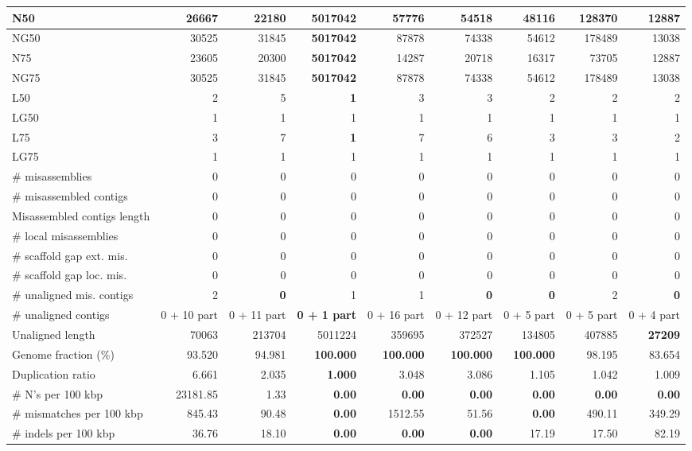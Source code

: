 \documentclass[12pt,a4paper]{article}
\begin{document}
\begin{table}[ht]
\begin{center}
\begin{tabular}{|l*{8}{|r}|}
N50 & 26667 & 22180 & {\bf 5017042} & 57776 & 54518 & 48116 & 128370 & 12887 \\ \hline
NG50 & 30525 & 31845 & {\bf 5017042} & 87878 & 74338 & 54612 & 178489 & 13038 \\ \hline
N75 & 23605 & 20300 & {\bf 5017042} & 14287 & 20718 & 16317 & 73705 & 12887 \\ \hline
NG75 & 30525 & 31845 & {\bf 5017042} & 87878 & 74338 & 54612 & 178489 & 13038 \\ \hline
L50 & 2 & 5 & {\bf 1} & 3 & 3 & 2 & 2 & 2 \\ \hline
LG50 & 1 & 1 & 1 & 1 & 1 & 1 & 1 & 1 \\ \hline
L75 & 3 & 7 & {\bf 1} & 7 & 6 & 3 & 3 & 2 \\ \hline
LG75 & 1 & 1 & 1 & 1 & 1 & 1 & 1 & 1 \\ \hline
\# misassemblies & 0 & 0 & 0 & 0 & 0 & 0 & 0 & 0 \\ \hline
\# misassembled contigs & 0 & 0 & 0 & 0 & 0 & 0 & 0 & 0 \\ \hline
Misassembled contigs length & 0 & 0 & 0 & 0 & 0 & 0 & 0 & 0 \\ \hline
\# local misassemblies & 0 & 0 & 0 & 0 & 0 & 0 & 0 & 0 \\ \hline
\# scaffold gap ext. mis. & 0 & 0 & 0 & 0 & 0 & 0 & 0 & 0 \\ \hline
\# scaffold gap loc. mis. & 0 & 0 & 0 & 0 & 0 & 0 & 0 & 0 \\ \hline
\# unaligned mis. contigs & 2 & {\bf 0} & 1 & 1 & {\bf 0} & {\bf 0} & 2 & {\bf 0} \\ \hline
\# unaligned contigs & 0 + 10 part & 0 + 11 part & {\bf 0 + 1 part} & 0 + 16 part & 0 + 12 part & 0 + 5 part & 0 + 5 part & 0 + 4 part \\ \hline
Unaligned length & 70063 & 213704 & 5011224 & 359695 & 372527 & 134805 & 407885 & {\bf 27209} \\ \hline
Genome fraction (\%) & 93.520 & 94.981 & {\bf 100.000} & {\bf 100.000} & {\bf 100.000} & {\bf 100.000} & 98.195 & 83.654 \\ \hline
Duplication ratio & 6.661 & 2.035 & {\bf 1.000} & 3.048 & 3.086 & 1.105 & 1.042 & 1.009 \\ \hline
\# N's per 100 kbp & 23181.85 & 1.33 & {\bf 0.00} & {\bf 0.00} & {\bf 0.00} & {\bf 0.00} & {\bf 0.00} & {\bf 0.00} \\ \hline
\# mismatches per 100 kbp & 845.43 & 90.48 & {\bf 0.00} & 1512.55 & 51.56 & {\bf 0.00} & 490.11 & 349.29 \\ \hline
\# indels per 100 kbp & 36.76 & 18.10 & {\bf 0.00} & {\bf 0.00} & {\bf 0.00} & 17.19 & 17.50 & 82.19 \\ \hline

\end{tabular}
\end{center}
\end{table}
\end{document}

